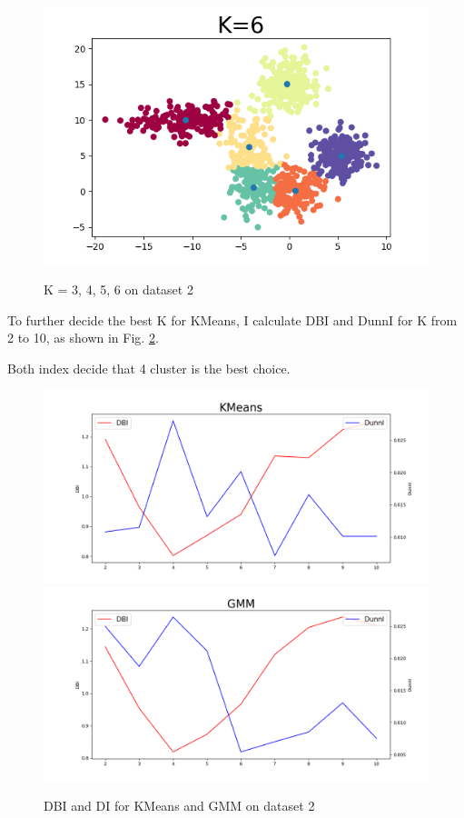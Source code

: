 \documentclass[conference]{IEEEtran}
\begin{document}
\begin{figure}[h]
	{\includegraphics[scale=0.28]{k=6}}
	\caption{K = 3, 4, 5, 6 on dataset 2}
	\label{p2_345}
\end{figure}

To further decide the best K for KMeans, I calculate DBI and DunnI for K from 2 to 10, as shown in Fig. \ref{DDI}.

Both index decide that 4 cluster is the best choice.

\begin{figure}[htbp]
	{\includegraphics[scale=0.3]{KM_DDI.png}}
	{\includegraphics[scale=0.3]{GM_DDI.png}}
	\caption{DBI and DI for KMeans and GMM on dataset 2}
	\label{DDI}
\end{figure}
\end{document}
